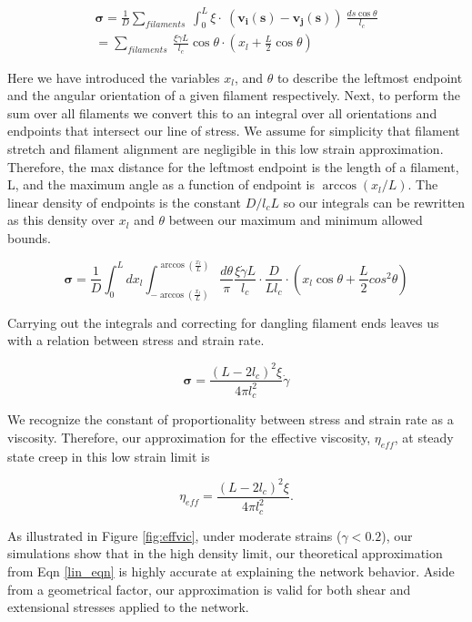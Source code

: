 \begin{multline}
\mathbf{\sigma} =  \frac{1}{D}\sum_{filaments}\:  \int_0^L \xi \cdot  \: (\mathbf{v_i(s)}-\mathbf{v_j(s)}) \:\frac{ds \cos \theta }{l_c} \\
 = \sum_{filaments}\:  \frac{\xi \dot \gamma L}{l_c} \cos \theta \cdot (x_l + \frac{L}{2} \cos \theta)
\end{multline}

Here we have introduced the variables $x_l$, and $\theta$ to describe the leftmost endpoint and the angular orientation of a given filament respectively.  Next, to perform the sum over all filaments we convert this to an integral over all orientations and endpoints that intersect our line of stress. We assume for simplicity that filament stretch and filament alignment are negligible in this low strain approximation.  Therefore, the max distance for the leftmost endpoint is the length of a filament, L, and the maximum angle as a function of endpoint is $\arccos(x_l/L)$.  The linear density of endpoints is the constant $D/l_cL$ so our integrals can be rewritten as this density over $x_l$ and $\theta$ between our maximum and minimum allowed bounds.

\begin{equation}
\mathbf{\sigma} =  \frac{1}{D} \int_0^L dx_l \int_{-\arccos (\frac{x_l}{L})}^{\arccos (\frac{x_l}{L})}\frac{d\theta}{\pi} \frac{\xi \dot \gamma L}{l_c} \cdot \frac{D}{Ll_c}\cdot (x_l \cos \theta + \frac{L}{2} cos^2\theta)
\end{equation}

Carrying out the integrals and correcting for dangling filament ends leaves us with a relation between stress and strain rate.

\begin{equation}
\mathbf{\sigma} = \frac{(L-2l_c)^2 \xi}{4\pi l_c^2} \dot \gamma 
\end{equation}

We recognize the constant of proportionality between stress and strain rate as a viscosity.  Therefore, our approximation for the effective viscosity, $\eta_{eff}$, at steady state creep in this low strain limit is

\begin{equation}
\label{lin_eqn}
\eta_{eff} = \frac{(L-2l_c)^2 \xi}{4\pi l_c^2} .
\end{equation}

As illustrated in Figure \ref{fig:effvic}, under moderate strains ($\gamma<0.2$), our  simulations show that in the high density limit, our theoretical approximation from Eqn \ref{lin_eqn} is highly accurate at explaining the network behavior.  Aside from a geometrical factor, our approximation is valid for both shear and extensional stresses applied to the network.

